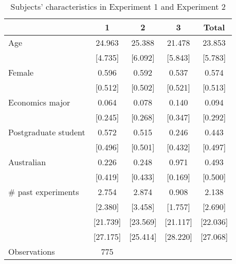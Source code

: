 \begin{table}[htbp]\centering \caption{Subjects' characteristics in Experiment 1 and Experiment 2} \begin{tabular}{l*{4}{c}} \hline\hline
                    &           1&           2&           3&       Total\\
\hline
Age                 &      24.963&      25.388&      21.478&      23.853\\
                    &     [4.735]&     [6.092]&     [5.843]&     [5.783]\\
[1em]
Female              &       0.596&       0.592&       0.537&       0.574\\
                    &     [0.512]&     [0.502]&     [0.521]&     [0.513]\\
[1em]
Economics major     &       0.064&       0.078&       0.140&       0.094\\
                    &     [0.245]&     [0.268]&     [0.347]&     [0.292]\\
[1em]
Postgraduate student&       0.572&       0.515&       0.246&       0.443\\
                    &     [0.496]&     [0.501]&     [0.432]&     [0.497]\\
[1em]
Australian          &       0.226&       0.248&       0.971&       0.493\\
                    &     [0.419]&     [0.433]&     [0.169]&     [0.500]\\
[1em]
# past experiments  &       2.754&       2.874&       0.908&       2.138\\
                    &     [2.380]&     [3.458]&     [1.757]&     [2.690]\\
[1em]
                    &    [21.739]&    [23.569]&    [21.117]&    [22.036]\\
[1em]
                    &    [27.175]&    [25.414]&    [28.220]&    [27.068]\\
\hline
Observations        &         775&            &            &            \\
\hline\hline
\end{tabular}
\end{table}
